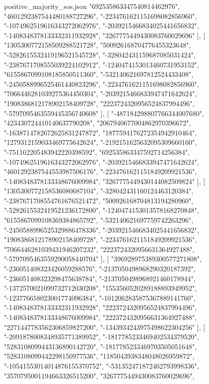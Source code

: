 \begin{filecontents*}[overwrite]{positive_majority_sos.json}
    "692535863347540814462976",
    "4601292387544480188727296",
    "-2234761621151698082856960",
    "-1074962519616343272062976",
    "-2039215466834025441656832",
    "-1408348378133332311932928",
    "3267775449430083760029696"
   ],
   [
    "1305300772158509288521728",
    "500926168704776455323648",
    "-5282615532419196521545728",
    "-328042431159687085031424",
    "-2387671708555039224102912",
    "-1240474153013460731953152",
    "6155867099108185850511360",
    "-532140621697812524433408",
    "-2450588996525461440823296",
    "-2234761621151698082856960",
    "7066446281039275364450304",
    "-2039215466833947471642624",
    "1908386812178902158409728",
    "2223724320956524837994496",
    "-5797095463559445356740608"
   ],
   [
    "-487184298807766344007680",
    "423430724410140637790208",
    "2067940677004862970396672",
    "-1638714782672625831247872",
    "1877594176272354942910464",
    "1279312159033469775642624",
    "-2192151625632095309660160",
    "-751162205483942220398592",
    "692535863347592714256384",
    "-1074962519616343272062976",
    "-2039215466833947471642624",
    "4601292387544553987506176",
    "-2234761621151849209921536",
    "-1408348378133348676009984",
    "3267775449430144082509824"
   ],
   [
    "1305300772158536080687104",
    "-328042431160124463120384",
    "-2387671708554761676521472",
    "500926168704813194280960",
    "-5282615532419521236172800",
    "-1240474153013578168270848",
    "6155867099108369384865792",
    "-532140621697759742263296",
    "-2450588996525329886478336",
    "-2039215466834025441656832",
    "1908386812178902158409728",
    "-2234761621151849209921536",
    "7066446281039431946207232",
    "2223724320956631364927488",
    "-5797095463559290058440704"
   ],
   [
    "396928975389300577271808",
    "-236051408323426059288576",
    "-2137050498968290320187392",
    "-236051408323298475638784",
    "-2137050498968921460178944",
    "-1372570021099732712030208",
    "1553560520289188893949952",
    "-123776658023001774096384",
    "-1012062835875367889141760",
    "-1408348378133332311932928",
    "2223724320956524837994496",
    "-1408348378133348676009984",
    "2223724320956631364927488",
    "2271447783562306859827200",
    "-1343934243975498622304256"
   ],
   [
    "-2091878008348935771389952",
    "-1817785233469402534379520",
    "5283108099443136890142720",
    "-1817785233469703505051648",
    "5283108099442298150977536",
    "1185043938348048026959872",
    "-10541553014014876155370752",
    "-531352471872462793998336",
    "3570795001194663326515200",
    "3267775449430083760029696",

\end{filecontents*}
